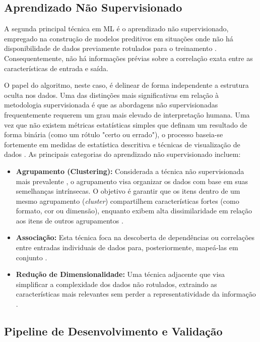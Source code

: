 \documentclass{uflamon}          %
\begin{document}
\subsection{Aprendizado Não Supervisionado}

A segunda principal técnica em ML é o aprendizado não supervisionado, empregado na construção de modelos preditivos em situações onde não há disponibilidade de dados previamente rotulados para o treinamento \cite{solorio2020}. Consequentemente, não há informações prévias sobre a correlação exata entre as características de entrada e saída.

O papel do algoritmo, neste caso, é delinear de forma independente a estrutura oculta nos dados. Uma das distinções mais significativas em relação à metodologia supervisionada é que as abordagens não supervisionadas frequentemente requerem um grau mais elevado de interpretação humana. Uma vez que não existem métricas estatísticas simples que definam um resultado de forma binária (como um rótulo "certo ou errado"), o processo baseia-se fortemente em medidas de estatística descritiva e técnicas de visualização de dados \cite{gopal2018}. As principais categorias do aprendizado não supervisionado incluem:

\begin{itemize}
    \item \textbf{Agrupamento (Clustering):} Considerada a técnica não supervisionada mais prevalente \cite{kononenko2007}, o agrupamento visa organizar os dados com base em suas semelhanças intrínsecas. O objetivo é garantir que os itens dentro de um mesmo agrupamento (\textit{cluster}) compartilhem características fortes (como formato, cor ou dimensão), enquanto exibem alta dissimilaridade em relação aos itens de outros agrupamentos \cite{iglesias2021, shalev2014}.
    \item \textbf{Associação:} Esta técnica foca na descoberta de dependências ou correlações entre entradas individuais de dados para, posteriormente, mapeá-las em conjunto \cite{dike2018}.
    \item \textbf{Redução de Dimensionalidade:} Uma técnica adjacente que visa simplificar a complexidade dos dados não rotulados, extraindo as características mais relevantes sem perder a representatividade da informação \cite{gopal2018}.
\end{itemize}

\subsection{Pipeline de Desenvolvimento e Validação}
\end{document}
